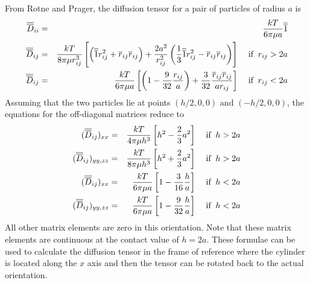\documentclass[12pt]{article}
\begin{document}
%

From Rotne and Prager, the diffusion tensor for a pair of
particles of radius $a$ is
\begin{eqnarray*}
\overline{\overline{D}}_{ii} & = & \frac{kT}{6\pi\mu a}\overline{\overline{1}} \\
\overline{\overline{D}}_{ij} & = & \frac{kT}{8\pi\mu r_{ij}^3}\left[\left(\overline{\overline{1}} r_{ij}^2 +\overline{r}_{ij}
\overline{r}_{ij}\right) +\frac{2a^2}{r_{ij}^2}\left(\frac{1}{3}\overline{\overline{1}} r_{ij}^2
-\overline{r}_{ij}\overline{r}_{ij}\right)\right] \;\;\;\; \mbox{if}\;\; r_{ij} > 2a \\
\overline{\overline{D}}_{ij} & = & \frac{kT}{6\pi\mu a}\left[\left(1-\frac{9}{32}\frac{r_{ij}}{a}\right)
+\frac{3}{32}\frac{\overline{r}_{ij}\overline{r}_{ij}}{ar_{ij}}\right] \;\;\;\; \mbox{if} \;\; r_{ij}<2a
\end{eqnarray*}
Assuming that the two particles lie at points $(h/2,0,0)$ and $(-h/2,0,0)$,
the equations for the off-diagonal matrices reduce to
\begin{eqnarray*}
(\overline{\overline{D}}_{ij})_{xx} & = & \frac{kT}{4\pi\mu h^3}\left[h^2-\frac{2}{3}a^2\right]
 \;\;\;\;\mbox{if}\;\;h>2a \\
(\overline{\overline{D}}_{ij})_{yy,zz} & = & \frac{kT}{8\pi\mu h^3}\left[h^2+\frac{2}{3}a^2\right]
 \;\;\;\;\mbox{if}\;\;h>2a \\
(\overline{\overline{D}}_{ij})_{xx} & = & \frac{kT}{6\pi\mu a}\left[1-\frac{3}{16}\frac{h}{a}\right]
 \;\;\;\;\mbox{if}\;\;h<2a \\
(\overline{\overline{D}}_{ij})_{yy,zz} & = & \frac{kT}{6\pi\mu a}\left[1-\frac{9}{32}\frac{h}{a}\right]
 \;\;\;\;\mbox{if}\;\;h<2a
\end{eqnarray*}
All other matrix elements are zero in this orientation. Note that these matrix
elements are continuous at the contact value of $h=2a$. These formulae can be used to
calculate the diffusion tensor in the frame of reference where the cylinder is located
along the $x$ axis and then the tensor can be rotated back to the actual orientation.
\end{document}
